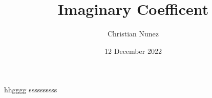 \documentclass[mla8]{mla}
\title{Imaginary Coefficent}
\author{Christian Nunez}
\date{12 December 2022}
\begin{document}
\hspace{0.49 in}hhgggg ssssssssss
\end{document}

